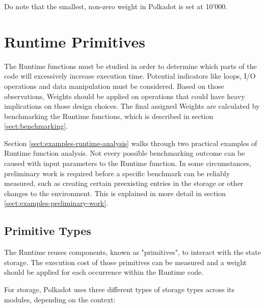 \documentclass[11pt,a4paper]{article}
\begin{document}
Do note that the smallest, non-zero weight in Polkadot is set at 10'000.

\section{Runtime Primitives}
The Runtime functions must be studied in order to determine which parts of the
code will excessively increase execution time. Potential indicators like loops,
I/O operations and data manipulation must be considered. Based on those
observations, Weights should be applied on operations that could have heavy
implications on those design choices. The final assigned Weights are calculated
by benchmarking the Runtime functions, which is described in section
\ref{sect:benchmarking}.
\newline

Section \ref{sect:examples-runtime-analysis} walks through two practical
examples of Runtime function analysis. Not every possible benchmarking outcome
can be caused with input parameters to the Runtime function. In some
circumstances, preliminary work is required before a specific benchmark can be
reliably measured, such as creating certain preexisting entries in the storage
or other changes to the environment. This is explained in more detail in section
\ref{sect:examples-preliminary-work}.

\subsection{Primitive Types}\label{sect:primitive-types}
The Runtime reuses components, known as "primitives", to interact with the state
storage. The execution cost of those primitives can be measured and a weight
should be applied for each occurrence within the Runtime code.
\newline

For storage, Polkadot uses three different types of storage types across its
modules, depending on the context:
\end{document}
